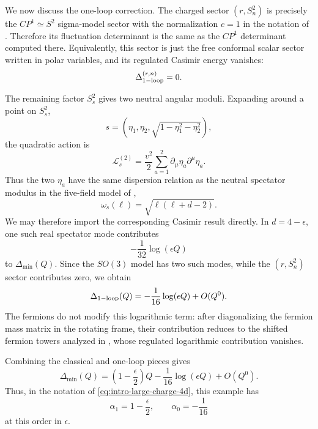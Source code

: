 \documentclass[a4paper,11pt]{article}
\newcommand\Dm{\Delta_{\min}}
\begin{document}
We now discuss the one-loop correction. The charged sector $(r,S^2_n)$ is precisely the $CP^1\simeq S^2$ sigma-model sector with the normalization $c=1$ in the notation of \cite{Cuomo:2024fuy}. Therefore its fluctuation determinant is the same as the $CP^1$ determinant computed there. Equivalently, this sector is just the free conformal scalar sector written in polar variables, and its regulated Casimir energy vanishes:
\begin{equation}
  \Delta^{(r,n)}_{\rm 1-loop}=0 .
\end{equation}

The remaining factor $S^2_s$ gives two neutral angular moduli. Expanding around a point on $S^2_s$,
\begin{equation}
  s=(\eta_1,\eta_2,\sqrt{1-\eta_1^2-\eta_2^2}) ,
\end{equation}
the quadratic action is
\begin{equation}
  \mathcal L^{(2)}_s = \frac{v^2}{2} \sum_{a=1}^2 \partial_\mu \eta_a \partial^\mu \eta_a .
\end{equation}
Thus the two $\eta_a$ have the same dispersion relation as the neutral spectator modulus in the five-field model of \cite{Cuomo:2024fuy},
\begin{equation}
  \omega_s(\ell)=\sqrt{\ell(\ell+d-2)} .
\end{equation}
We may therefore import the corresponding Casimir result directly. In $d=4-\epsilon$, one such real spectator mode contributes
\begin{equation}
  -\frac{1}{32}\log(\epsilon Q)
\end{equation}
to $\Dm(Q)$. Since the $SO(3)$ model has two such modes, while the $(r,S^2_n)$ sector contributes zero, we obtain
\begin{equation}
  \Delta_{\rm 1-loop}(Q) = -\frac{1}{16}\log(\epsilon Q)+O(Q^0).
\end{equation}
The fermions do not modify this logarithmic term: after diagonalizing the fermion mass matrix in the rotating frame, their contribution reduces to the shifted fermion towers analyzed in \cite{Cuomo:2024fuy}, whose regulated logarithmic contribution vanishes.

Combining the classical and one-loop pieces gives
\begin{equation}
  \Dm(Q) = \left(1-\frac{\epsilon}{2}\right)Q -\frac{1}{16}\log(\epsilon Q) +O(Q^0) .
\end{equation}
Thus, in the notation of \eqref{eq:intro-large-charge-4d}, this example has
\begin{equation}
  \alpha_1=1-\frac{\epsilon}{2}, \qquad \alpha_0=-\frac{1}{16}
\end{equation}
at this order in $\epsilon$.
\end{document}
